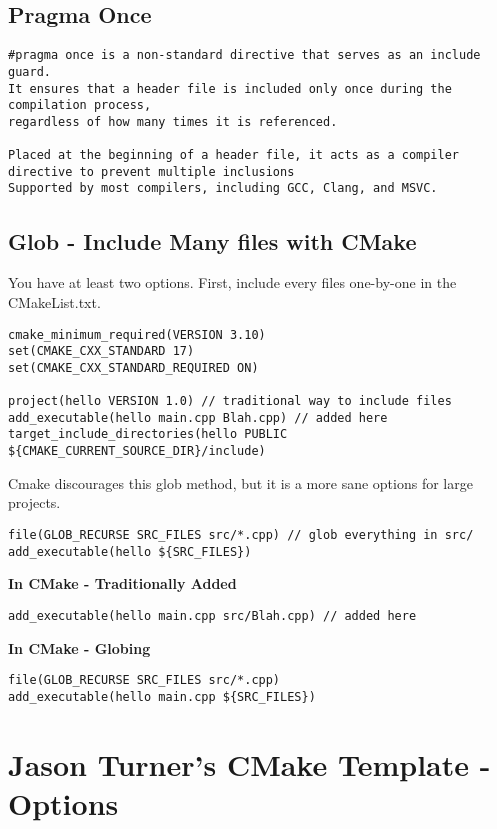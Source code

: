 \documentclass[openany]{report}
\begin{document}
\subsection{Pragma Once}

\begin{verbatim}
#pragma once is a non-standard directive that serves as an include guard. 
It ensures that a header file is included only once during the compilation process,
regardless of how many times it is referenced.

Placed at the beginning of a header file, it acts as a compiler directive to prevent multiple inclusions
Supported by most compilers, including GCC, Clang, and MSVC.
\end{verbatim}

\subsection{Glob - Include Many files with CMake}
 
You have at least two options. First, include every files one-by-one in the CMakeList.txt.
\begin{verbatim}
cmake_minimum_required(VERSION 3.10)
set(CMAKE_CXX_STANDARD 17)
set(CMAKE_CXX_STANDARD_REQUIRED ON)

project(hello VERSION 1.0) // traditional way to include files
add_executable(hello main.cpp Blah.cpp) // added here
target_include_directories(hello PUBLIC ${CMAKE_CURRENT_SOURCE_DIR}/include)
\end{verbatim}

Cmake discourages this glob method, but it is a more sane options for large projects.

\begin{verbatim}
file(GLOB_RECURSE SRC_FILES src/*.cpp) // glob everything in src/
add_executable(hello ${SRC_FILES})
\end{verbatim}

\textbf{In CMake - Traditionally Added}
\begin{verbatim}
add_executable(hello main.cpp src/Blah.cpp) // added here
\end{verbatim}

\textbf{In CMake - Globing}
\begin{verbatim}
file(GLOB_RECURSE SRC_FILES src/*.cpp)
add_executable(hello main.cpp ${SRC_FILES})
\end{verbatim}

\section{Jason Turner's CMake Template - Options}
\end{document}
